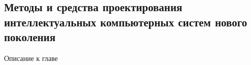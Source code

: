 
\begin{partbacktext}
\part{Методы и средства проектирования интеллектуальных компьютерных систем нового поколения}
\noindent Описание к главе
\end{partbacktext}




